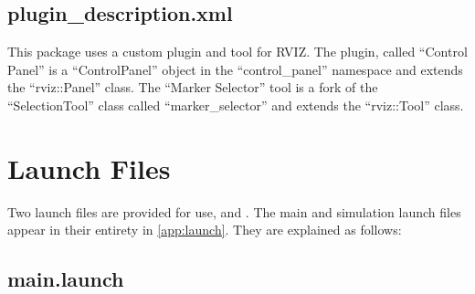 \subsection{plugin\_description.xml}
This package uses a custom plugin and tool for RVIZ. The plugin, called ``Control Panel'' is a ``ControlPanel'' object in the ``control\_panel'' namespace and extends the ``rviz::Panel'' class. The ``Marker Selector'' tool is a fork of the ``SelectionTool'' class called ``marker\_selector'' and extends the ``rviz::Tool'' class.\\
\section{Launch Files}
Two launch files are provided for use,  and . The main and simulation launch files appear in their entirety in \ref{app:launch}. They are explained as follows: 

\subsection{main.launch}

